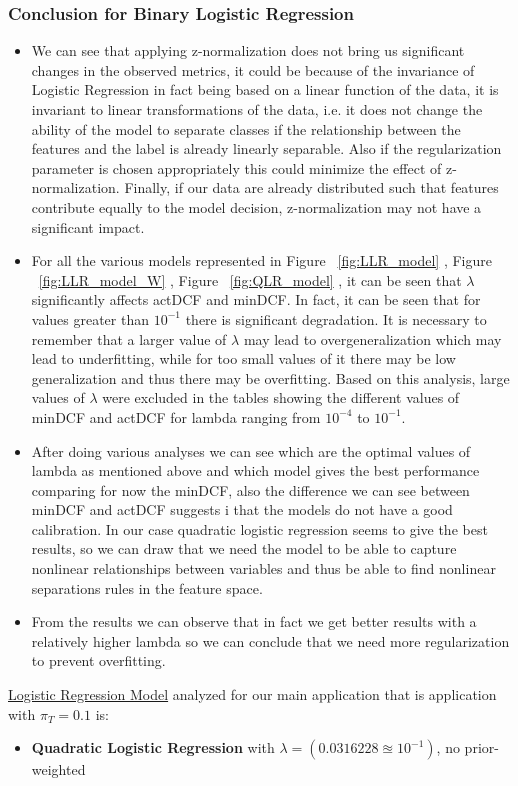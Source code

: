 \documentclass{article}
\begin{document}
\subsubsection*{Conclusion for Binary Logistic Regression}
\begin{itemize}
    \item We can see that applying z-normalization does not bring us significant changes in the observed metrics, it could be because of the invariance of Logistic Regression in fact being based on a linear function of the data, it is invariant to linear transformations of the data, i.e. it does not change the ability of the model to separate classes if the relationship between the features and the label is already linearly separable.  Also if the regularization parameter is chosen appropriately this could minimize the effect of z-normalization. Finally, if our data are already distributed such that features contribute equally to the model decision, z-normalization may not have a significant impact.  
    \item For all the various models represented in
    Figure ~\ref{fig:LLR_model} ,
    Figure ~\ref{fig:LLR_model_W} ,
    Figure ~\ref{fig:QLR_model} ,
    it can be seen that \(\lambda\) significantly affects actDCF and minDCF. In fact, it can be seen that for values greater than \(10^{-1}\) there is significant degradation. It is necessary to remember that a larger value of \(\lambda\) may lead to overgeneralization which may lead to underfitting, while for too small values of it there may be low generalization and thus there may be overfitting. Based on this analysis, large values of \(\lambda\) were excluded in the tables showing the different values of minDCF and actDCF for lambda ranging from \(10^{-4}\) to \(10^{-1}\).
\item After doing various analyses we can see which are the optimal values of lambda as mentioned above 
and which model gives the best performance comparing for now the minDCF, also the difference we can see between minDCF and actDCF suggests i that the models do not have a good calibration.
In our case quadratic logistic regression seems to give the best results, so we can draw that we need the model to be able to capture nonlinear relationships between variables and thus be able to find nonlinear separations rules in the feature space.
\item From the results we can observe that in fact we get better results with a relatively higher lambda so we can conclude that we need more regularization to prevent overfitting.
\end{itemize}
\underline{Logistic Regression Model} analyzed for our main application that is application with \(\pi_T=0.1\) is:
\begin{itemize}
    \item \textbf{Quadratic Logistic Regression} with \(\lambda=(0.0316228\approxeq 10^{-1})\), no prior-weighted
\end{itemize}
\end{document}
